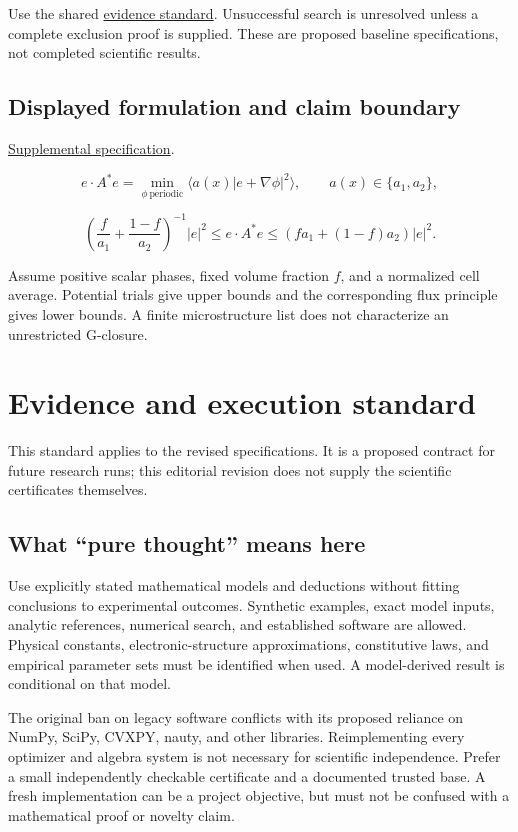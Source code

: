 \documentclass[
  11pt,
]{article}
\begin{document}
Use the shared
\href{https://github.com/rick-stevens-ai/Pure-Thought/blob/main/reviews/EVIDENCE-STANDARD.md}{evidence
standard}. Unsuccessful search is unresolved unless a complete exclusion
proof is supplied. These are proposed baseline specifications, not
completed scientific results.

\subsection{Displayed formulation and claim boundary}

\href{https://github.com/rick-stevens-ai/Pure-Thought/blob/main/supplemental/S03.md}{Supplemental
specification}.

\[e\cdot A^*e=\min_{\phi\ \mathrm{periodic}}
\langle a(x)|e+\nabla\phi|^2\rangle,\qquad a(x)\in\{a_1,a_2\},\]

\[\left(\frac f{a_1}+\frac{1-f}{a_2}\right)^{-1}|e|^2
\le e\cdot A^*e\le(fa_1+(1-f)a_2)|e|^2.\]

Assume positive scalar phases, fixed volume fraction \(f\), and a
normalized cell average. Potential trials give upper bounds and the
corresponding flux principle gives lower bounds. A finite microstructure
list does not characterize an unrestricted G-closure.

\section{Evidence and execution standard}

This standard applies to the revised specifications. It is a proposed
contract for future research runs; this editorial revision does not
supply the scientific certificates themselves.

\subsection{What ``pure thought'' means here}

Use explicitly stated mathematical models and deductions without fitting
conclusions to experimental outcomes. Synthetic examples, exact model
inputs, analytic references, numerical search, and established software
are allowed. Physical constants, electronic-structure approximations,
constitutive laws, and empirical parameter sets must be identified when
used. A model-derived result is conditional on that model.

The original ban on legacy software conflicts with its proposed reliance
on NumPy, SciPy, CVXPY, nauty, and other libraries. Reimplementing every
optimizer and algebra system is not necessary for scientific
independence. Prefer a small independently checkable certificate and a
documented trusted base. A fresh implementation can be a project
objective, but must not be confused with a mathematical proof or novelty
claim.
\end{document}
